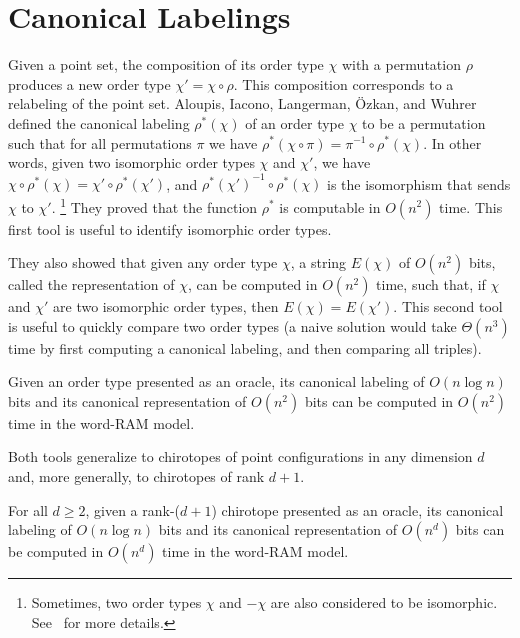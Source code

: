 \section{Canonical Labelings}%
\label{sec:point-configurations:canonical-labelings}

Given a point set, the composition of its order type \(\chi\) with a
permutation \(\rho\) produces a new order type \(\chi' = \chi \circ \rho\).
This composition corresponds to a relabeling of the point set.
%
Aloupis,
Iacono,
Langerman,
{\"{O}}zkan,
and Wuhrer~\cite{AILOW14}
defined the canonical labeling \(\rho^*(\chi)\)
of an order type \(\chi\) to be a permutation such that for all permutations
\(\pi\) we have \(\rho^*(\chi \circ \pi) = \pi^{-1} \circ \rho^*(\chi)\).
In other words, given two isomorphic order types \(\chi\) and \(\chi'\), we
have \(\chi \circ \rho^*(\chi) = \chi' \circ \rho^*(\chi')\), and
\({\rho^*(\chi')}^{-1} \circ \rho^*(\chi)\) is the isomorphism that sends
\(\chi\) to \(\chi'\).%
\footnote{Sometimes, two order types \(\chi\) and \(- \chi\) are also considered
to be isomorphic. See~\cite{AILOW14} for more details.}
They proved that the function \(\rho^*\) is
computable in \(O(n^2)\) time.
%
This first tool is useful to identify isomorphic order types.

They also showed that given any order type \(\chi\), a string \(E(\chi)\) of
\(O(n^2)\) bits, called the representation of \(\chi\), can be computed in
\(O(n^2)\) time, such that, if \(\chi\) and \(\chi'\) are two isomorphic order
types, then \(E(\chi) = E(\chi')\).
%
This second tool is useful to quickly compare two order types (a naive solution
would take \(\Theta(n^3)\) time by first computing a canonical labeling, and
then comparing all triples).

\begin{lemma}[%
  name={%
    Aloupis,
    Iacono,
    Langerman,
    {\"{O}}zkan,
    and Wuhrer~\cite{AILOW14}%
  },%
  label={lem:canonical-labeling}%
]
  Given an order type presented as an oracle,
  its canonical labeling of \(O(n \log n)\) bits
  and
  its canonical representation of \(O(n^2)\) bits
  can be computed in \(O(n^2)\) time
  in the word-RAM model.
\end{lemma}

Both tools generalize to chirotopes of point configurations in any dimension
\(d\) and, more generally, to chirotopes of rank \(d+1\).

\begin{lemma}[%
  name={%
    Aloupis,
    Iacono,
    Langerman,
    {\"{O}}zkan,
    and Wuhrer~\cite{AILOW14}%
  },%
  label={lem:canonical-labeling-d}%
]
  For all \(d \geq 2\),
  given a rank-(\(d+1\)) chirotope presented as an oracle,
  its canonical labeling of \(O(n \log n)\) bits
  and
  its canonical representation of \(O(n^d)\) bits
  can be computed in \(O(n^d)\) time
  in the word-RAM model.
\end{lemma}

